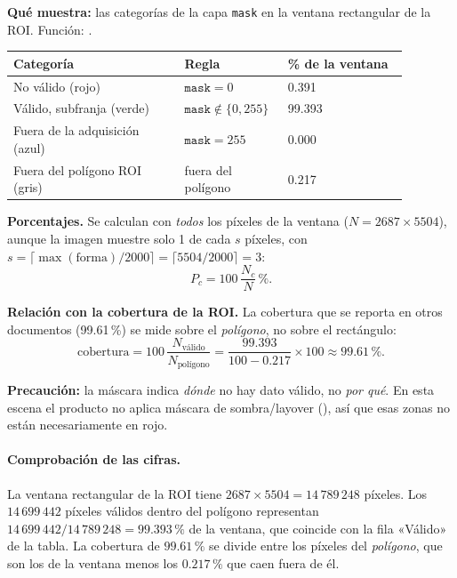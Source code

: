 \documentclass[11pt,a4paper]{article}
\begin{document}
\textbf{Qué muestra:} las categorías de la capa \texttt{mask} en la ventana rectangular de la ROI. Función: .

\begin{longtable}{p{0.40\linewidth}p{0.20\linewidth}p{0.28\linewidth}}
\toprule
\textbf{Categoría} & \textbf{Regla} & \textbf{\% de la ventana} \\
\midrule
No válido (rojo) & $\texttt{mask} = 0$ & 0.391 \\
Válido, subfranja (verde) & $\texttt{mask} \notin \{0,255\}$ & 99.393 \\
Fuera de la adquisición (azul) & $\texttt{mask} = 255$ & 0.000 \\
Fuera del polígono ROI (gris) & fuera del polígono & 0.217 \\
\bottomrule
\end{longtable}

\textbf{Porcentajes.} Se calculan con \emph{todos} los píxeles de la ventana ($N = 2687 \times 5504$), aunque la imagen muestre solo 1
de cada $s$ píxeles, con $s = \lceil \max(\text{forma}) / 2000 \rceil = \lceil 5504/2000 \rceil = 3$:
\begin{equation}
  P_c = 100\,\frac{N_c}{N}\,\mathrm{\%}.
\end{equation}

\textbf{Relación con la cobertura de la ROI.} La cobertura que se reporta en otros documentos (99.61\,\%) se mide sobre el
\emph{polígono}, no sobre el rectángulo:
\begin{equation}
  \text{cobertura} = 100\,\frac{N_{\text{válido}}}{N_{\text{polígono}}}
  = \frac{99.393}{100 - 0.217}\times 100 \approx 99.61\,\mathrm{\%}.
\end{equation}

\textbf{Precaución:} la máscara indica \emph{dónde} no hay dato válido, no \emph{por qué}. En esta escena el producto no aplica
máscara de sombra/layover (), así que esas zonas no están necesariamente en rojo.

\paragraph{Comprobación de las cifras.} La ventana rectangular de la ROI tiene $2687\times5504=14\,789\,248$
píxeles. Los $14\,699\,442$ píxeles válidos dentro del polígono representan $14\,699\,442/14\,789\,248=99.393\,\mathrm{\%}$
de la ventana, que coincide con la fila «Válido» de la tabla. La cobertura de $99.61\,\mathrm{\%}$ se divide entre los
píxeles del \emph{polígono}, que son los de la ventana menos los $0.217\,\mathrm{\%}$ que caen fuera de él.
\end{document}
